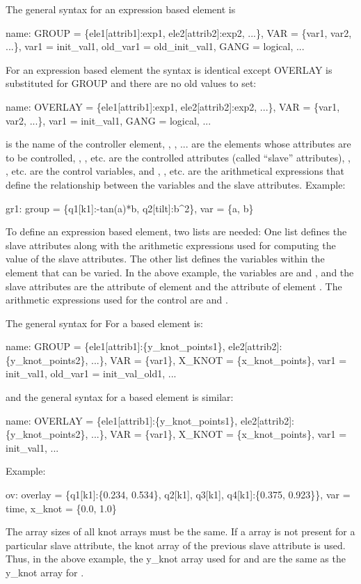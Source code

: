 The general syntax for an expression based  element is
\begin{example}
  name: GROUP = \{ele1[attrib1]:exp1, ele2[attrib2]:exp2, ...\}, 
          VAR = \{var1, var2, ...\}, var1 = init_val1, 
          old_var1 = old_init_val1, GANG = logical, ...
\end{example}
For an  expression based  element the syntax is identical except OVERLAY is
substituted for GROUP and there are no old values to set:
\begin{example}
  name: OVERLAY = \{ele1[attrib1]:exp1, ele2[attrib2]:exp2, ...\}, 
          VAR = \{var1, var2, ...\}, var1 = init_val1, GANG = logical, ...
\end{example}
 is the name of the controller element, , ,
... are the elements whose attributes are to be controlled,
, , etc. are the controlled attributes (called
``slave'' attributes), , , etc. are the control
variables, and , , etc. are the arithmetical
expressions that define the relationship between the variables and the
slave attributes. Example:
\begin{example}
  gr1: group = \{q1[k1]:-tan(a)*b, q2[tilt]:b^2\}, var = \{a, b\}
\end{example}

To define an expression based  element, two lists are needed: One list defines the
slave attributes along with the arithmetic expressions used for computing the value of the slave
attributes. The other list defines the variables within the  element that can be
varied. In the above example, the variables are  and , and the slave attributes are the
 attribute of element  and the  attribute of element . The arithmetic
expressions used for the control are  and .

The general syntax for For a  based  element is:
\begin{example}
  name: GROUP = \{ele1[attrib1]:\{y_knot_points1\}, ele2[attrib2]:\{y_knot_points2\}, ...\}, 
              VAR = \{var1\}, X_KNOT = \{x_knot_points\},
              var1 = init_val1, old_var1 = init_val_old1, ...
\end{example}
and the general syntax for a  based  element is similar:
\begin{example}
  name: OVERLAY = \{ele1[attrib1]:\{y_knot_points1\}, ele2[attrib2]:\{y_knot_points2\}, ...\}, 
              VAR = \{var1\}, X_KNOT = \{x_knot_points\}, var1 = init_val1, ...
\end{example}
Example:
\begin{example}
  ov: overlay = \{q1[k1]:\{0.234, 0.534\}, q2[k1], q3[k1], q4[k1]:\{0.375, 0.923\}\}, 
        var = {time}, x_knot = \{0.0, 1.0\}
\end{example}
The array sizes of all knot arrays must be the same. If a  array is not present
for a particular slave attribute, the knot array of the previous slave attribute is used. Thus, in
the above example, the y_knot array used for  and  are the same as the y_knot
array for .

